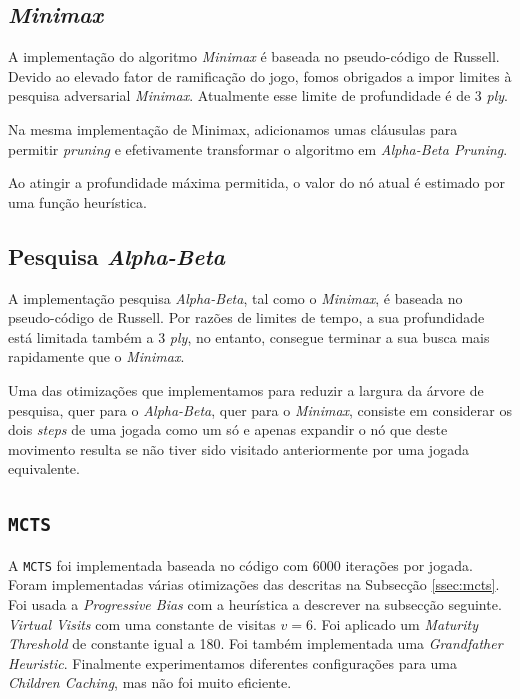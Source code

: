\documentclass[12pt,a4paper,oneside]{article}
\begin{document}
\subsection{\textit{Minimax}}

A implementação do algoritmo \textit{Minimax} é baseada no pseudo-código de
Russell\cite{Russell:AI:2003}. Devido ao elevado fator de ramificação
do jogo, fomos obrigados a impor limites à pesquisa adversarial
\textit{Minimax}. Atualmente esse limite de profundidade é de 3 \emph{ply}.

Na mesma implementação de Minimax, adicionamos umas cláusulas para
permitir \emph{pruning} e efetivamente transformar o algoritmo em
\emph{Alpha-Beta Pruning}.

Ao atingir a profundidade máxima permitida, o valor do nó atual é
estimado por uma função heurística.

\subsection{Pesquisa \textit{Alpha-Beta}}

A implementação pesquisa \textit{Alpha-Beta}, tal como o
\emph{Minimax}, é baseada no pseudo-código de
Russell\cite{Russell:AI:2003}. Por razões de limites de tempo, a sua
profundidade está limitada também a 3 \emph{ply}, no entanto, consegue
terminar a sua busca mais rapidamente que o \emph{Minimax}.

Uma das otimizações que implementamos para reduzir a largura da árvore
de pesquisa, quer para o \emph{Alpha-Beta}, quer para o
\emph{Minimax}, consiste em considerar os dois \emph{steps} de uma
jogada como um só e apenas expandir o nó que deste movimento resulta
se não tiver sido visitado anteriormente por uma jogada equivalente.

\subsection{\texttt{MCTS}}

A \texttt{MCTS} foi implementada baseada no código \cite{MCTSHub} com
6000 iterações por jogada. Foram implementadas várias otimizações das
descritas na Subsecção \ref{ssec:mcts}. Foi usada a
\textit{Progressive Bias} com a heurística a descrever na subsecção
seguinte. \textit{Virtual Visits} com uma constante de visitas $v =
6$. Foi aplicado um \textit{Maturity Threshold} de constante igual a
180. Foi também implementada uma \textit{Grandfather
  Heuristic}. Finalmente experimentamos diferentes configurações para
uma \textit{Children Caching}, mas não foi muito eficiente.
\end{document}
